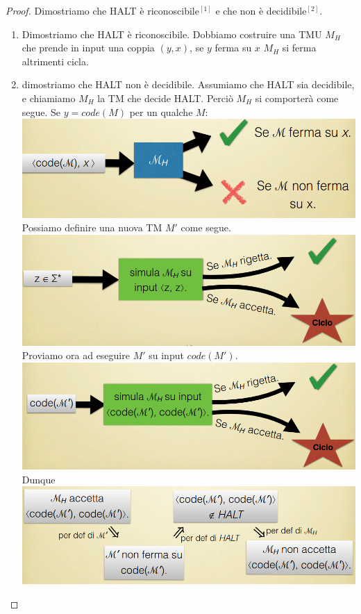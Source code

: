 \documentclass[a4paper, 12pt]{article}
\begin{document}
\begin{proof}
Dimostriamo che HALT \`e riconoscibile$^{[1]}$ e che non \`e decidibile$^{[2]}$.\\
\begin{enumerate}
\item Dimostriamo che HALT \`e riconoscibile. Dobbiamo costruire una TMU $M_H$ che prende in input una coppia $(y,x)$, se $y$ ferma su $x$ $M_H$ si ferma altrimenti cicla.
\item dimostriamo che HALT non \`e decidibile. Assumiamo che HALT sia decidibile, e chiamiamo $M_H$ la TM che decide HALT. Perci\`o $M_H$ si comporter\`a come segue. Se $y=code(M)$ per un qualche $M$: \\\includegraphics[scale=0.4]{TM_HALT1.png}\\
Possiamo definire una nuova TM $M'$ come segue.\\ \includegraphics[scale=0.4]{TM_HALT2.png}\\
Proviamo ora ad  eseguire $M'$ su input $code(M')$.\\ \includegraphics[scale=0.4]{TM_HALT3.png}
\\Dunque \\
\includegraphics[scale=0.4]{HALT4.png}\\

\end{enumerate}
\end{proof}
\end{document}
